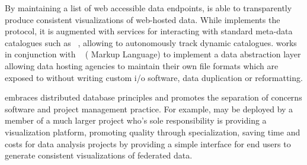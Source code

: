 By maintaining a list of web accessible data endpoints, \sciwms{} is
able to transparently produce consistent visualizations of web-hosted
data. While \sciwms{} implements the \ogc{} \wms{}~\cite{wms14}
protocol, it is augmented with services for interacting with standard
meta-data catalogues such as \csw{}~\cite{csw14}, allowing \sciwms{}
to autonomously track dynamic catalogues. \sciwms{} works in conjunction
with \ncml{}~\cite{ncml06} (\netcdf{} Markup Language) to implement a data
abstraction layer allowing data hosting agencies to maintain their own
file formats which are exposed to \sciwms{} without writing custom i/o
software, data duplication or reformatting.

\sciwms{} embraces distributed database principles and promotes the
separation of concerns software and project management practice. For
example, \sciwms{} may be deployed by a member of a much larger
project who's sole responsibility is providing a visualization
platform, promoting quality through specialization, saving time and
costs for data analysis projects by providing a simple interface for
end users to generate consistent visualizations of federated data.
